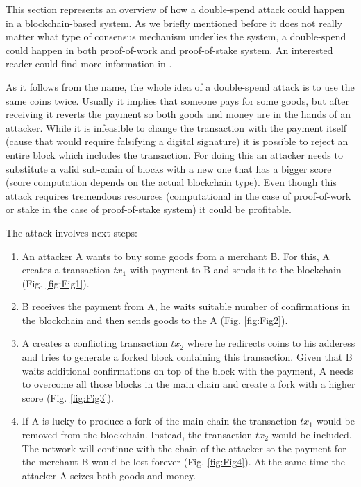 \documentclass[10pt,a4paper]{article}
\numberwithin{equation}{section} %
\theoremstyle{plain}
\theoremstyle{definition}
\theoremstyle{remark}
\begin{document}
	This section represents an overview of how a double-spend attack could happen in a blockchain-based system. As we briefly mentioned before it does not really matter what type of consensus mechanism underlies the system, a double-spend could happen in both proof-of-work and proof-of-stake system. An interested reader could find more information in \cite{bitcoinwiki}.
	
	As it follows from the name, the whole idea of a double-spend attack is to use the same coins twice. Usually it implies that someone pays for some goods, but after receiving it reverts the payment so both goods and money are in the hands of an attacker. While it is infeasible to change the transaction with the payment itself (cause that would require falsifying a digital signature) it is possible to reject an entire block which includes the transaction. For doing this an attacker needs to substitute a valid sub-chain of blocks with a new one that has a bigger score (score computation depends on the actual blockchain type). Even though this attack requires tremendous resources (computational in the case of proof-of-work or stake in the case of proof-of-stake system) it could be profitable.
	
	The attack involves next steps:
	\begin{enumerate}
        \item An attacker A wants to buy some goods from a merchant B. For this, A creates a transaction \(tx_1\) with payment to B and sends it to the blockchain (Fig. \ref{fig:Fig1}).
        \item B receives the payment from A, he waits suitable number of confirmations in the blockchain and then sends goods to the A (Fig. \ref{fig:Fig2}).
        \item A creates a conflicting transaction \(tx_2\) where he redirects coins to his adderess and tries to generate a forked block containing this transaction. Given that B waits additional confirmations on top of the block with the payment, A needs to overcome all those blocks in the main chain and create a fork with a higher score (Fig. \ref{fig:Fig3}).
        \item If A is lucky to produce a fork of the main chain the transaction \(tx_1\) would be removed from the blockchain. Instead, the transaction \(tx_2\) would be included. The network will continue with the chain of the attacker so the payment for the merchant B would be lost forever (Fig. \ref{fig:Fig4}). At the same time the attacker A seizes both goods and money.
    \end{enumerate}
    
\end{document}
